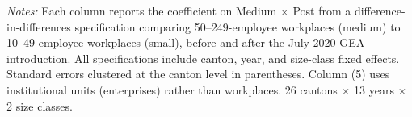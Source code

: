 \begin{table}[htbp]
   \par \raggedright 
   \textit{Notes:} Each column reports the coefficient on Medium $\times$ Post from a difference-in-differences specification comparing 50--249-employee workplaces (medium) to 10--49-employee workplaces (small), before and after the July 2020 GEA introduction. All specifications include canton, year, and size-class fixed effects. Standard errors clustered at the canton level in parentheses. Column (5) uses institutional units (enterprises) rather than workplaces. 26 cantons $\times$ 13 years $\times$ 2 size classes.
\end{table}


